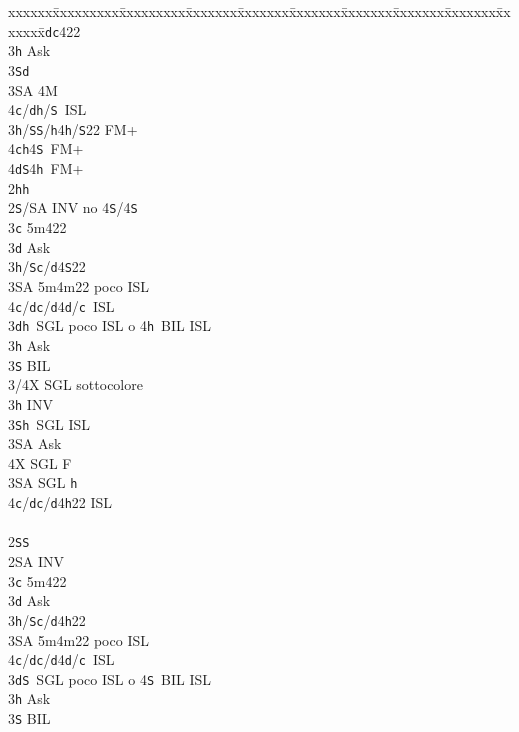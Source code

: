 \documentclass[a4paper,italian]{article}
\newcommand{\BS}{\small{\texttt{S}}}
\newcommand{\BC}{\small{\texttt{c}}}
\newcommand{\BD}{\small{\texttt{d}}}
\newcommand{\BH}{\small{\texttt{h}}}
\newenvironment{bidtable}
{\begin{tabbing}

    xxxxxx\=xxxxxxxxx\=xxxxxxxxx\=xxxxxxx\=xxxxxxx\=xxxxxxx\=xxxxxxx\=xxxxxxx\=xxxxxxx\=xxxxxxx\=\kill}
{\end{tabbing} }%
\begin{document}
\begin{multicols}{2}
\begin{bidtable}
        3\BD {}\BC 422\+\\
        3\BH \> Ask\+\\
        3\BS {}\BD \\
        3\small{SA} \> 4M\\
        4\BC/\BD {}\BH /\BS\ ISL\-\-\\
        3\BH/\BS {}\BS /\BH 4\BH /\BS 22 FM+\\
        4\BC {}\BH 4\BS\ FM+\\
        4\BD {}\BS 4\BH\ FM+\-\\
        2\BH {}\BH \+\\
        2\BS/SA \> INV no 4\BS/4\BS \\
        3\BC \> 5m422\+\\
        3\BD \> Ask\+\\
        3\BH/\BS {}\BC /\BD 4\BS 22\\
        3\small{SA} \> 5m4m22 poco ISL\\
        4\BC/\BD {}\BC /\BD 4\BD /\BC\ ISL\-\-\\
        3\BD {}\BH\ SGL poco ISL o 4\BH\ BIL ISL\+\\
        3\BH \> Ask\+\\
        3\BS \> BIL\\
        3/4X \> SGL sottocolore\-\-\\
        3\BH \> INV\\
        3\BS {}\BH\ SGL ISL\+\\
        3\small{SA} \> Ask\+\\
        4X \> SGL F\-\-\\
        3\small{SA} \> SGL \BH \\
        4\BC/\BD {}\BC /\BD 4\BH 22 ISL\-\\
        \\
        2\BS {}\BS \+\\
        2\small{SA} \> INV\\
        3\BC \> 5m422\+\\
        3\BD \> Ask\+\\
        3\BH/\BS {}\BC /\BD 4\BH 22\\
        3\small{SA} \> 5m4m22 poco ISL\\
        4\BC/\BD {}\BC /\BD 4\BD /\BC\ ISL\-\-\\
        3\BD {}\BS\ SGL poco ISL o 4\BS\ BIL ISL\+\\
        3\BH \> Ask\+\\
        3\BS \> BIL\\

\end{bidtable}
\end{multicols}
\end{document}
